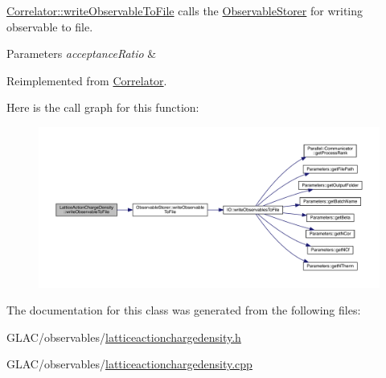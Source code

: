 \mbox{\hyperlink{class_correlator_a9e8d80e30e4fbe3b7fe57521538cb5ff}{Correlator\+::write\+Observable\+To\+File}} calls the \mbox{\hyperlink{class_observable_storer}{Observable\+Storer}} for writing observable to file. 


\begin{DoxyParams}{Parameters}
{\em acceptance\+Ratio} & \\
\hline
\end{DoxyParams}


Reimplemented from \mbox{\hyperlink{class_correlator_a9e8d80e30e4fbe3b7fe57521538cb5ff}{Correlator}}.

Here is the call graph for this function\+:\nopagebreak
\begin{figure}[H]
\begin{center}
\leavevmode
\includegraphics[width=350pt]{class_lattice_action_charge_density_a719f71aaccbf1b4147ea944781d69908_cgraph}
\end{center}
\end{figure}


The documentation for this class was generated from the following files\+:\begin{DoxyCompactItemize}
\item 
G\+L\+A\+C/observables/\mbox{\hyperlink{latticeactionchargedensity_8h}{latticeactionchargedensity.\+h}}\item 
G\+L\+A\+C/observables/\mbox{\hyperlink{latticeactionchargedensity_8cpp}{latticeactionchargedensity.\+cpp}}\end{DoxyCompactItemize}
